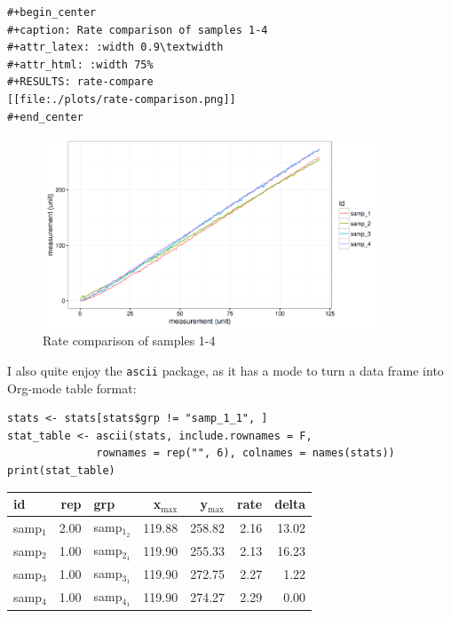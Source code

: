 \documentclass[11pt]{article}
\begin{document}
\begin{verbatim}
#+begin_center
#+caption: Rate comparison of samples 1-4
#+attr_latex: :width 0.9\textwidth
#+attr_html: :width 75%
#+RESULTS: rate-compare
[[file:./plots/rate-comparison.png]]
#+end_center
\end{verbatim}

\begin{center}
\begin{figure}[htb]
\centering
\includegraphics[width=0.9\textwidth]{./plots/rate-comparison.png}
\caption{Rate comparison of samples 1-4}
\end{figure}
\end{center}

I also quite enjoy the \texttt{ascii} package, as it has a mode to turn a data frame into
Org-mode table format:

\begin{verbatim}
stats <- stats[stats$grp != "samp_1_1", ]
stat_table <- ascii(stats, include.rownames = F,
              rownames = rep("", 6), colnames = names(stats))
print(stat_table)
\end{verbatim}

\begin{center}
\begin{tabular}{lrlrrrr}
\toprule
id & rep & grp & x\(_{\text{max}}\) & y\(_{\text{max}}\) & rate & delta\\
\midrule
samp\(_{\text{1}}\) & 2.00 & samp\(_{\text{1}}_{\text{2}}\) & 119.88 & 258.82 & 2.16 & 13.02\\
samp\(_{\text{2}}\) & 1.00 & samp\(_{\text{2}}_{\text{1}}\) & 119.90 & 255.33 & 2.13 & 16.23\\
samp\(_{\text{3}}\) & 1.00 & samp\(_{\text{3}}_{\text{1}}\) & 119.90 & 272.75 & 2.27 & 1.22\\
samp\(_{\text{4}}\) & 1.00 & samp\(_{\text{4}}_{\text{1}}\) & 119.90 & 274.27 & 2.29 & 0.00\\
\bottomrule
\end{tabular}
\end{center}
\end{document}
